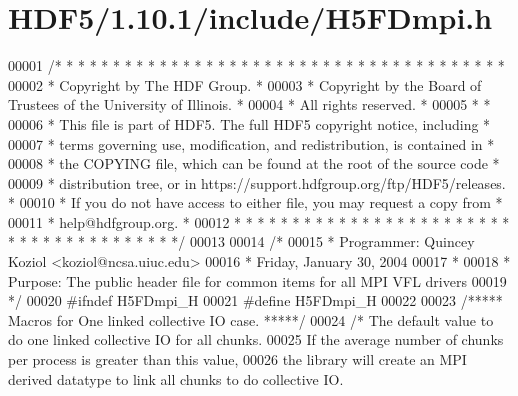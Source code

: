 \hypertarget{_h_d_f5_21_810_81_2include_2_h5_f_dmpi_8h_source}{}\section{H\+D\+F5/1.10.1/include/\+H5\+F\+Dmpi.h}
\label{_h_d_f5_21_810_81_2include_2_h5_f_dmpi_8h_source}

\begin{DoxyCode}
00001 \textcolor{comment}{/* * * * * * * * * * * * * * * * * * * * * * * * * * * * * * * * * * * * * * *}
00002 \textcolor{comment}{ * Copyright by The HDF Group.                                               *}
00003 \textcolor{comment}{ * Copyright by the Board of Trustees of the University of Illinois.         *}
00004 \textcolor{comment}{ * All rights reserved.                                                      *}
00005 \textcolor{comment}{ *                                                                           *}
00006 \textcolor{comment}{ * This file is part of HDF5.  The full HDF5 copyright notice, including     *}
00007 \textcolor{comment}{ * terms governing use, modification, and redistribution, is contained in    *}
00008 \textcolor{comment}{ * the COPYING file, which can be found at the root of the source code       *}
00009 \textcolor{comment}{ * distribution tree, or in https://support.hdfgroup.org/ftp/HDF5/releases.  *}
00010 \textcolor{comment}{ * If you do not have access to either file, you may request a copy from     *}
00011 \textcolor{comment}{ * help@hdfgroup.org.                                                        *}
00012 \textcolor{comment}{ * * * * * * * * * * * * * * * * * * * * * * * * * * * * * * * * * * * * * * */}
00013 
00014 \textcolor{comment}{/*}
00015 \textcolor{comment}{ * Programmer:  Quincey Koziol <koziol@ncsa.uiuc.edu>}
00016 \textcolor{comment}{ *              Friday, January 30, 2004}
00017 \textcolor{comment}{ *}
00018 \textcolor{comment}{ * Purpose: The public header file for common items for all MPI VFL drivers}
00019 \textcolor{comment}{ */}
00020 \textcolor{preprocessor}{#ifndef H5FDmpi\_H}
00021 \textcolor{preprocessor}{#define H5FDmpi\_H}
00022 
00023 \textcolor{comment}{/***** Macros for One linked collective IO case. *****/}
00024 \textcolor{comment}{/* The default value to do one linked collective IO for all chunks.}
00025 \textcolor{comment}{   If the average number of chunks per process is greater than this value,}
00026 \textcolor{comment}{      the library will create an MPI derived datatype to link all chunks to do collective IO.}

\end{DoxyCode}
